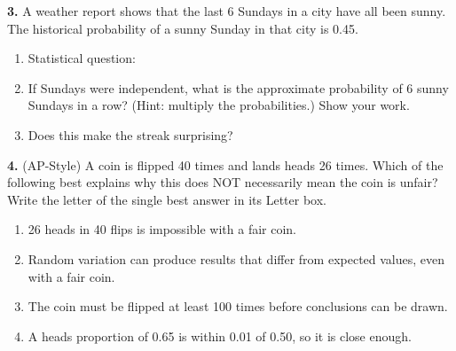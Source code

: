 \documentclass[10pt]{article}
\begin{document}
\begin{practicebox}
\vspace{8pt}
\textbf{3.} A weather report shows that the last 6 Sundays in a city have all been
sunny. The historical probability of a sunny Sunday in that city is 0.45.

\begin{enumerate}[label=(\alph*), leftmargin=2em, itemsep=8pt]
  \item Statistical question:\\
\tcbbreak
  \item If Sundays were independent, what is the approximate probability of 6 sunny
        Sundays in a row? (Hint: multiply the probabilities.) Show your work.\gradedbelow[r]{0.02in}{\gradedblank[id=hw3b, type=short, points=2, answer=0.0083, check=numeric, tolerance=0.0003]{0.9in}{0.24in}}
        \vspace{20pt}
  \item Does this make the streak surprising?\\
\end{enumerate}

\vspace{8pt}
\textbf{4.} (AP-Style) A coin is flipped 40 times and lands heads 26 times. Which
of the following best explains why this does NOT necessarily mean the coin is unfair?
Write the letter of the single best answer in its Letter box.

\begin{enumerate}[label=(\Alph*), leftmargin=2em, itemsep=4pt]
  \item 26 heads in 40 flips is impossible with a fair coin.
  \item Random variation can produce results that differ from expected values, even with a
        fair coin.
  \item The coin must be flipped at least 100 times before conclusions can be drawn.
  \item A heads proportion of 0.65 is within 0.01 of 0.50, so it is close enough.
        \hfill{}\rule[-14pt]{0pt}{32pt}
\end{enumerate}


\end{practicebox}
\end{document}
